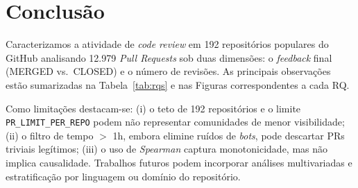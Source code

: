 \documentclass[11pt,a4paper]{article}
\begin{document}
\section{Conclus\~ao}

Caracterizamos a atividade de \emph{code review} em 192 reposit\'orios populares do GitHub
analisando 12.979 \emph{Pull Requests} sob duas dimens\~oes: o \emph{feedback} final
(MERGED vs.\ CLOSED) e o n\'umero de revis\~oes. As principais observa\c{c}\~oes est\~ao
sumarizadas na Tabela~\ref{tab:rqs} e nas Figuras correspondentes a cada RQ.

Como limita\c{c}\~oes destacam-se: (i) o teto de 192 reposit\'orios e o limite
\texttt{PR\_LIMIT\_PER\_REPO} podem n\~ao representar comunidades de menor visibilidade;
(ii) o filtro de tempo $>$ 1h, embora elimine ru\'idos de \emph{bots}, pode descartar PRs
triviais leg\'itimos; (iii) o uso de \emph{Spearman} captura monotonicidade, mas n\~ao
implica causalidade. Trabalhos futuros podem incorporar an\'alises multivariadas e estratifica\c{c}\~ao
por linguagem ou dom\'inio do reposit\'orio.
\end{document}
